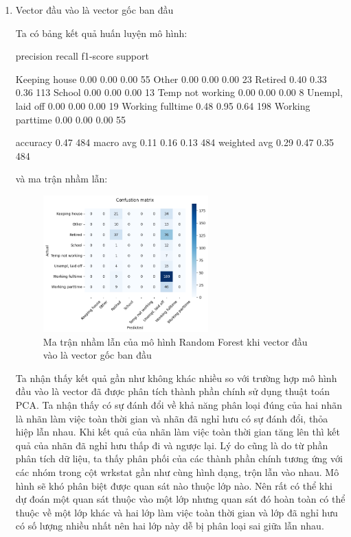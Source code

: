 \begin{enumerate}[label=(\alph*)]
    \item Vector đầu vào là vector gốc ban đầu
    
    Ta có bảng kết quả huấn luyện mô hình:

    \begin{python}
                    precision    recall  f1-score   support

   Keeping house       0.00      0.00      0.00        55
           Other       0.00      0.00      0.00        23
         Retired       0.40      0.33      0.36       113
          School       0.00      0.00      0.00        13
Temp not working       0.00      0.00      0.00         8
Unempl, laid off       0.00      0.00      0.00        19
Working fulltime       0.48      0.95      0.64       198
Working parttime       0.00      0.00      0.00        55

        accuracy                           0.47       484
       macro avg       0.11      0.16      0.13       484
    weighted avg       0.29      0.47      0.35       484
    \end{python}

    và ma trận nhầm lẫn:

    \begin{figure}[H]
        \centering
        \includegraphics[width=0.6\textwidth]{figures/Thanh/Models/Random_Forest/With_null_models_confusion_matrix_Random_Forest_original_features.png}
        \caption{Ma trận nhầm lẫn của mô hình Random Forest khi vector đầu vào là vector gốc ban đầu}
        \label{fig:With_null_models_confusion_matrix_Random_Forest_original_features}
    \end{figure}
    
    Ta nhận thấy kết quả gần như không khác nhiều so với trường hợp mô hình đầu vào là vector đã được phân tích thành phần chính sử dụng thuật toán PCA.
    Ta nhận thấy có sự đánh đổi về khả năng phân loại đúng của hai nhãn là nhãn làm việc toàn thời gian và nhãn đã nghỉ hưu có sự đánh đổi, thỏa hiệp lẫn nhau.
    Khi kết quả của nhãn làm việc toàn thời gian tăng lên thì kết quả của nhãn đã nghỉ hưu thấp đi và ngược lại.
    Lý do cũng là do từ phần phân tích dữ liệu, ta thấy phân phối của các thành phần chính tương ứng với các nhóm trong cột wrkstat gần như cùng hình dạng, trộn lẫn vào nhau.
    Mô hình sẽ khó phân biệt được quan sát nào thuộc lớp nào.
    Nên rất có thể khi dự đoán một quan sát thuộc vào một lớp nhưng quan sát đó hoàn toàn có thể thuộc về một lớp khác và hai lớp làm việc toàn thời gian và lớp đã nghỉ hưu có số lượng nhiều nhất nên hai lớp này dễ bị phân loại sai giữa lẫn nhau.


\end{enumerate}
